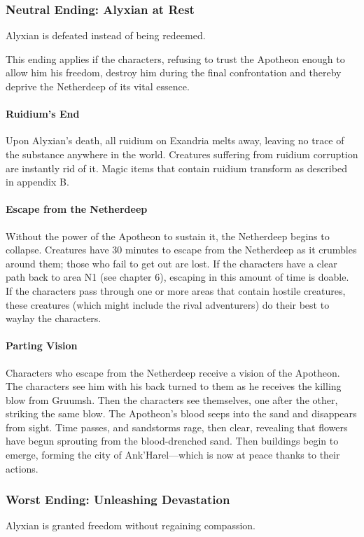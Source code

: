 \documentclass[10pt,a4paper,twoside,twocolumn,openany,nodeprecatedcode]{dndbook}
\begin{document}
\subsubsection{Neutral Ending: Alyxian at Rest}
Alyxian is defeated instead of being redeemed.

This ending applies if the characters, refusing to trust the Apotheon enough to allow him his freedom, destroy him during the final confrontation and thereby deprive the Netherdeep of its vital essence.

\paragraph{Ruidium's End}
Upon Alyxian's death, all ruidium on Exandria melts away, leaving no trace of the substance anywhere in the world. Creatures suffering from ruidium corruption are instantly rid of it. Magic items that contain ruidium transform as described in appendix B.

\paragraph{Escape from the Netherdeep}
Without the power of the Apotheon to sustain it, the Netherdeep begins to collapse. Creatures have 30 minutes to escape from the Netherdeep as it crumbles around them; those who fail to get out are lost. If the characters have a clear path back to area N1 (see chapter 6), escaping in this amount of time is doable. If the characters pass through one or more areas that contain hostile creatures, these creatures (which might include the rival adventurers) do their best to waylay the characters.

\paragraph{Parting Vision}
Characters who escape from the Netherdeep receive a vision of the Apotheon. The characters see him with his back turned to them as he receives the killing blow from Gruumsh. Then the characters see themselves, one after the other, striking the same blow. The Apotheon's blood seeps into the sand and disappears from sight. Time passes, and sandstorms rage, then clear, revealing that flowers have begun sprouting from the blood-drenched sand. Then buildings begin to emerge, forming the city of Ank'Harel—which is now at peace thanks to their actions.

\subsubsection{Worst Ending: Unleashing Devastation}
Alyxian is granted freedom without regaining compassion.
\end{document}
